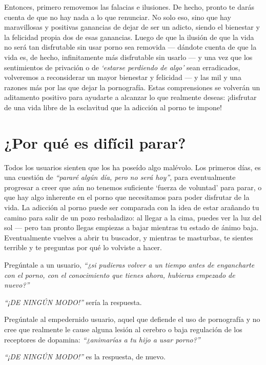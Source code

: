 \documentclass[
  spanish,
  openany]{book}
\begin{document}
Entonces, primero removemos las falacias e ilusiones. De hecho, pronto te darás cuenta de que no hay nada a lo que renunciar. No solo eso, sino que hay maravillosas y positivas ganancias de dejar de ser un adicto, siendo el bienestar y la felicidad propia dos de esas ganancias. Luego de que la ilusión de que la vida no será tan disfrutable sin usar porno sea removida --- dándote cuenta de que la vida es, de hecho, infinitamente más disfrutable sin usarlo --- y una vez que los sentimientos de privación o de \emph{`estarse perdiendo de algo'} sean erradicados, volveremos a reconsiderar un mayor bienestar y felicidad --- y las mil y una razones más por las que dejar la pornografía. Estas comprensiones se volverán un aditamento positivo para ayudarte a alcanzar lo que realmente deseas: ¡disfrutar de una vida libre de la esclavitud que la adicción al porno te impone!

\hypertarget{por-que-es-dificil-parar}{%
\chapter{¿Por qué es difícil parar?}\label{por-que-es-dificil-parar}}

Todos los usuarios sienten que los ha poseído algo malévolo. Los primeros días, es una cuestión de \emph{``pararé algún día, pero no será hoy''}, para eventualmente progresar a creer que aún no tenemos suficiente `fuerza de voluntad' para parar, o que hay algo inherente en el porno que necesitamos para poder disfrutar de la vida. La adicción al porno puede ser comparada con la idea de estar arañando tu camino para salir de un pozo resbaladizo: al llegar a la cima, puedes ver la luz del sol --- pero tan pronto llegas empiezas a bajar mientras tu estado de ánimo baja. Eventualmente vuelves a abrir tu buscador, y mientras te masturbas, te sientes terrible y te preguntas por qué lo volviste a hacer.

Pregúntale a un usuario, \emph{``¿si pudieras volver a un tiempo antes de engancharte con el porno, con el conocimiento que tienes ahora, hubieras empezado de nuevo?''}

\emph{``¡DE NINGÚN MODO!''} sería la respuesta.

Pregúntale al empedernido usuario, aquel que defiende el uso de pornografía y no cree que realmente le cause alguna lesión al cerebro o baja regulación de los receptores de dopamina: \emph{``¿animarías a tu hijo a usar porno?''}

\emph{``¡DE NINGÚN MODO!''} es la respuesta, de nuevo.
\end{document}
